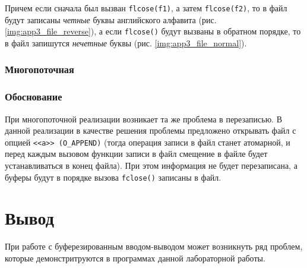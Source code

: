 Причем если сначала был вызван \texttt{flcose(f1)}, а затем \texttt{flcose(f2)}, то в файл будут записаны \textit{четные} буквы английского алфавита (рис. \ref{img:app3_file_reverse}), а если \texttt{flcose()} будут вызваны в обратном порядке, то в файл запишутся \textit{нечетные} буквы (рис. \ref{img:app3_file_normal}).





\subsection{Многопоточная}

\begin{center}
    \captionsetup{justification=raggedright,singlelinecheck=off}
    
\end{center}

\vspace{-1.5cm}
\subsection{Обоснование}
\vspace{-0.7cm}

При многопоточной реализации возникает та же проблема в перезаписью. В данной реализации в качестве решения проблемы предложено открывать файл с опцией \texttt{<<a>> (O\_APPEND)} (тогда операция записи в файл станет атомарной, и перед каждым вызовом функции записи в файл смещение в файле будет устанавливаться в конец файла). При этом информация не будет перезаписана, а буферы будут в порядке вызова \texttt{fclose()} записаны в файл.




\chapter*{Вывод}

При работе с буферезированным вводом-выводом может возникнуть ряд проблем, которые демонстритруются в программах данной лабораторной работы. 

